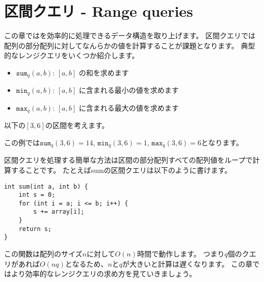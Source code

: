 \chapter{区間クエリ - Range queries}


この章ではを効率的に処理できるデータ構造を取り上げます。
区間クエリでは配列の部分配列に対してなんらかの値を計算することが課題となります。
典型的なレンジクエリをいくつか紹介します。

\begin{itemize}
\item $\texttt{sum}_q(a,b)$: $[a,b]$ の和を求めます
\item $\texttt{min}_q(a,b)$: $[a,b]$ に含まれる最小の値を求めます
\item $\texttt{max}_q(a,b)$: $[a,b]$ に含まれる最大の値を求めます
\end{itemize}

以下の$[3,6]$の区間を考えます。
\begin{center}
\end{center}
この例では$\texttt{sum}_q(3,6)=14$,
$\texttt{min}_q(3,6)=1$, $\texttt{max}_q(3,6)=6$となります。

区間クエリを処理する簡単な方法は区間の部分配列すべての配列値をループで計算することです。
たとえばsumの区間クエリは以下のように書けます。

\begin{lstlisting}
int sum(int a, int b) {
    int s = 0;
    for (int i = a; i <= b; i++) {
        s += array[i];
    }
    return s;
}
\end{lstlisting}

この関数は配列のサイズ$n$に対して$O(n)$時間で動作します。
つまり$q$個のクエリがあれば$O(nq)$となるため、$n$と$q$が大きいと計算は遅くなります。
この章ではより効率的なレンジクエリの求め方を見ていきましょう。

